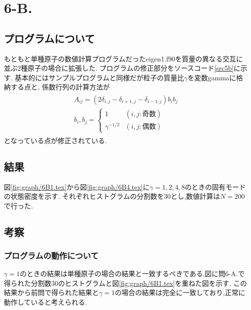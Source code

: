 \section{6-B.}
\subsection{プログラムについて}
もともと単種原子の数値計算プログラムだったeigen1.f90を質量の異なる交互に並ぶ2種原子の場合に拡張した.
プログラムの修正部分をソースコード\ref{src5b}に示す.
基本的にはサンプルプログラムと同様だが粒子の質量比$\gamma$を変数gammaに格納する点と,
係数行列の計算方法が
\begin{align}
  \begin{split}
    A_{ij}=(2\delta_{i,j}-\delta_{i+1,j}-\delta_{i-1,j}) b_i b_j\\
    b_i,b_j=\left\{\begin{array}{cc}
      1&(i,j:奇数)\\
      \gamma^{-1/2}&(i,j:偶数)
    \end{array}\right.
  \end{split}
\end{align}
となっている点が修正されている.
\newpage
\subsection{結果}
図\ref{fig:graph/6B1.tex}から図\ref{fig:graph/6B4.tex}に$\gamma=1,2,4,8$のときの固有モードの状態密度を示す.
それぞれヒストグラムの分割数を30とし,数値計算は$N=200$で行った.
\subsection{考察}
\subsubsection{プログラムの動作について}
$\gamma=1$のときの結果は単種原子の場合の結果と一致するべきである,図に問6-A.で得られた分割数30のヒストグラムと図\ref{fig:graph/6B1.tex}を重ねた図を示す.
この結果から前問で得られた結果と$\gamma=1$の場合の結果は完全に一致しており,正常に動作していると考えられる.
